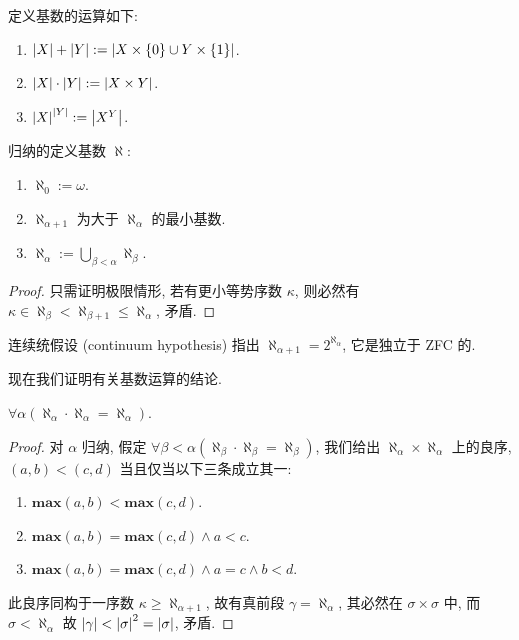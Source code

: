 定义基数的运算如下:

\begin{definition}
    \begin{enumerate}
        \item \(\abs{X} + \abs{Y} := \abs{X \times \{0\} \cup Y \times \{1\}}\).
        \item \(\abs{X} \cdot \abs{Y} := \abs{X \times Y}\).
        \item \(\abs{X}^\abs{Y} := \abs{X^Y}\).
    \end{enumerate}
\end{definition}


\begin{definition}
    \label{definition:aleph}
    归纳的定义基数 \(\aleph\):
    \begin{enumerate}
        \item \(\aleph_0 := \omega\).
        \item \(\aleph_{\alpha + 1}\) 为大于 \(\aleph_\alpha\) 的最小基数.
        \item \(\aleph_\alpha := \bigcup_{\beta < \alpha} \aleph_\beta\).
    \end{enumerate}

    \begin{proof}
        只需证明极限情形, 若有更小等势序数 \(\kappa\), 则必然有 \(\kappa \in \aleph_\beta < \aleph_{\beta + 1} \le \aleph_{\alpha}\), 矛盾.
    \end{proof}
\end{definition}

\begin{hypothesis}
    连续统假设 (continuum hypothesis) 指出 \(\aleph_{\alpha + 1} = 2^{\aleph_\alpha}\),
    它是独立于 ZFC 的.
\end{hypothesis}

现在我们证明有关基数运算的结论.

\begin{theorem}
    \label{theorem:cardinal multiplication}
    \(\forall \alpha (\aleph_\alpha \cdot \aleph_\alpha = \aleph_\alpha)\).

    \begin{proof}
        对 \(\alpha\) 归纳, 假定 \(\forall \beta < \alpha (\aleph_\beta \cdot \aleph_\beta = \aleph_\beta)\),
        我们给出 \(\aleph_\alpha \times \aleph_\alpha\) 上的良序, \((a,b) < (c,d)\) 当且仅当以下三条成立其一:

        \begin{enumerate}
            \item \(\mathbf{max} (a,b) < \mathbf{max} (c,d)\).
            \item \(\mathbf{max} (a,b) = \mathbf{max} (c,d) \land a < c\).
            \item \(\mathbf{max} (a,b) = \mathbf{max} (c,d) \land a = c \land b < d\).
        \end{enumerate}

        此良序同构于一序数 \(\kappa \ge \aleph_{\alpha + 1}\), 故有真前段 \(\gamma = \aleph_{\alpha}\), 其必然在 \(\sigma \times \sigma\) 中,
        而 \(\sigma < \aleph_\alpha\) 故 \(\abs{\gamma} < \abs{\sigma}^2 = \abs{\sigma}\), 矛盾.
    \end{proof}
\end{theorem}

